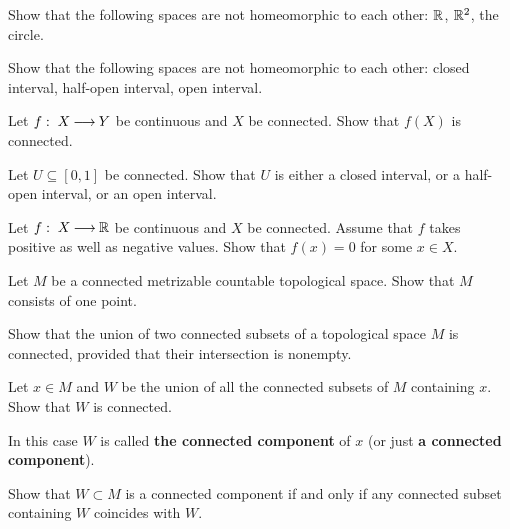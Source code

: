 \documentclass[12pt]{article}
\begin{document}
\begin{zadacha}[!]
Show that the following spaces are not homeomorphic to each other:
${\mathbb R}$, ${\mathbb R}^2$, the circle.
\end{zadacha}

\begin{zadacha}[!]
Show that the following spaces are not homeomorphic to each other:
closed interval, half-open interval, open interval.
\end{zadacha}

\begin{zadacha}
Let
$f:\; X {\:\longrightarrow\:} Y$ be continuous and  $X$ be connected.
Show that $f(X)$ is connected.
\end{zadacha}

\begin{zadacha}[!]
Let $U\subseteq [0,1]$ be connected.
Show that $U$ is either a
closed interval, or a half-open interval, or an open interval.
\end{zadacha}

\begin{zadacha}
Let
$f:\; X {\:\longrightarrow\:} {\mathbb R}$ be continuous and  $X$ be connected.
Assume that $f$ takes positive as well as negative values.
Show that $f(x)=0$ for some $x\in X$.
\end{zadacha}

\begin{zadacha}[*]
Let $M$ be a connected metrizable countable topological space.
Show that $M$ consists of one point.
\end{zadacha}

\begin{zadacha} 
Show that the union of two connected subsets of a topological space
$M$ is connected, provided that their intersection is nonempty.
\end{zadacha}


\begin{zadacha}[!]
Let $x\in M$ and  $W$ be the union of all the connected subsets of $M$
containing $x$. Show that $W$ is connected.
\end{zadacha}


\begin{opredelenie}
In this case $W$ is called {\bf the connected component}
of $x$ (or just {\bf a connected component}).
\end{opredelenie}

\begin{zadacha}
Show that $W\subset M$ is a connected component if and only if
any connected subset containing $W$ coincides with $W$.
\end{zadacha}
\end{document}
